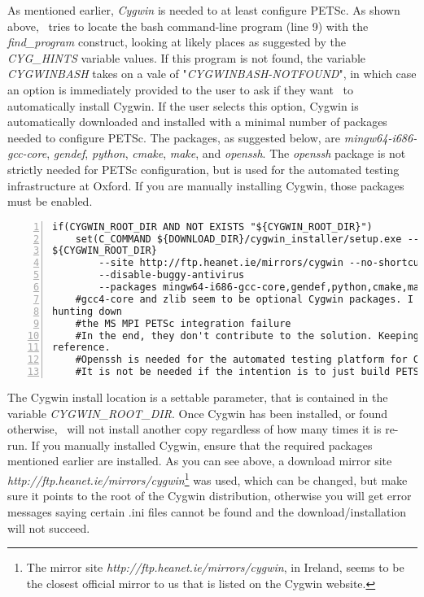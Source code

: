 \documentclass[10pt,a4paper]{article}
\begin{document}
As mentioned earlier, \textit{Cygwin} is needed to at least configure PETSc. As
shown above, \chastelibbuilder\ tries to locate the bash command-line program
(line 9) with the \textit{find\_program} construct, looking at likely places as
suggested by the \textit{CYG\_HINTS} variable values. If this program is not
found, the variable \textit{CYGWINBASH} takes on a vale of
"\textit{CYGWINBASH-NOTFOUND}", in which case an option is immediately provided
to the user to ask if they want \chastelibbuilder\ to automatically install
Cygwin. If the user selects this option, Cygwin is automatically downloaded and
installed with a minimal number of packages needed to configure PETSc. The
packages, as suggested below, are \textit{mingw64-i686-gcc-core},
\textit{gendef}, \textit{python}, \textit{cmake}, \textit{make}, and
\textit{openssh}. The \textit{openssh} package is not strictly needed for PETSc
configuration, but is used for the automated testing infrastructure at Oxford.
If you are manually installing Cygwin, those packages must be enabled.

\begin{codeparchment}
\begin{lstlisting}[numbers=left]
 if(CYGWIN_ROOT_DIR AND NOT EXISTS "${CYGWIN_ROOT_DIR}")
	set(C_COMMAND ${DOWNLOAD_DIR}/cygwin_installer/setup.exe --root
${CYGWIN_ROOT_DIR} 
		--site http://ftp.heanet.ie/mirrors/cygwin --no-shortcuts --quiet-mode
		--disable-buggy-antivirus 
		--packages mingw64-i686-gcc-core,gendef,python,cmake,make,openssh)
	#gcc4-core and zlib seem to be optional Cygwin packages. I added them while
hunting down 
	#the MS MPI PETSc integration failure
	#In the end, they don't contribute to the solution. Keeping a record here for
reference.  
	#Openssh is needed for the automated testing platform for Chaste. 
	#It is not be needed if the intention is to just build PETSc.
\end{lstlisting}
\end{codeparchment}

The Cygwin install location is a settable parameter, that is contained in the
variable \textit{CYGWIN\_ROOT\_DIR}. Once Cygwin has been installed, or found
otherwise, \chastelibbuilder\ will not install another copy regardless of how
many times it is re-run. If you manually installed Cygwin, ensure that the
required packages mentioned earlier are installed. As you can see above, a
download mirror site \textit{http://ftp.heanet.ie/mirrors/cygwin}\footnote{The
mirror site \textit{http://ftp.heanet.ie/mirrors/cygwin}, in Ireland, seems to
be the closest official mirror to us that is listed on the Cygwin website.} was
used, which can be changed, but make sure it points to the root of the Cygwin
distribution, otherwise you will get error messages saying certain .ini files
cannot be found and the download/installation will not succeed.
\end{document}
